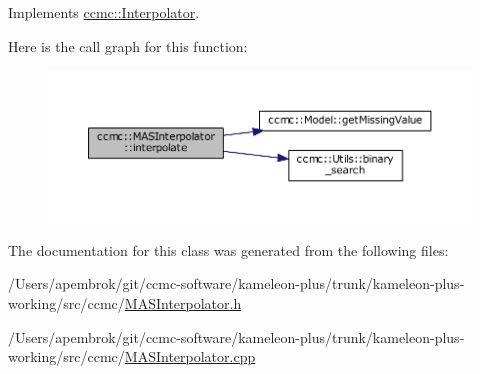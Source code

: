 Implements \hyperlink{classccmc_1_1_interpolator_aa6b272bd53630020d92938ec1e5cfad9}{ccmc\-::\-Interpolator}.



Here is the call graph for this function\-:\nopagebreak
\begin{figure}[H]
\begin{center}
\leavevmode
\includegraphics[width=350pt]{classccmc_1_1_m_a_s_interpolator_ab4015bfd559e1eac116ef1772be91b03_cgraph}
\end{center}
\end{figure}




The documentation for this class was generated from the following files\-:\begin{DoxyCompactItemize}
\item 
/\-Users/apembrok/git/ccmc-\/software/kameleon-\/plus/trunk/kameleon-\/plus-\/working/src/ccmc/\hyperlink{_m_a_s_interpolator_8h}{M\-A\-S\-Interpolator.\-h}\item 
/\-Users/apembrok/git/ccmc-\/software/kameleon-\/plus/trunk/kameleon-\/plus-\/working/src/ccmc/\hyperlink{_m_a_s_interpolator_8cpp}{M\-A\-S\-Interpolator.\-cpp}\end{DoxyCompactItemize}
